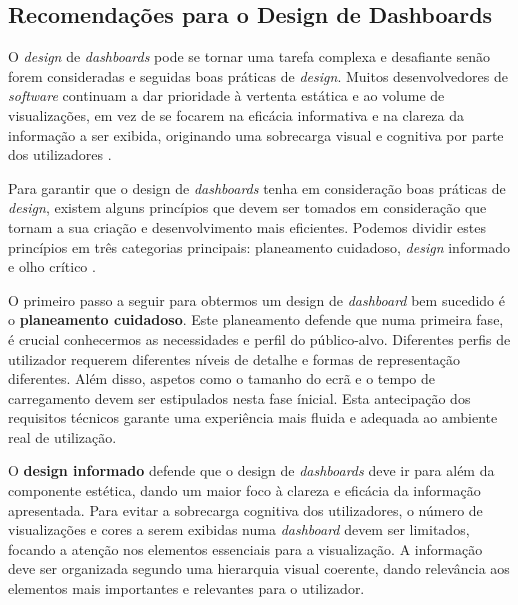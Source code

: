 \subsection{Recomendações para o Design de Dashboards} %
\label{sub:recomendacoes_design}


O \textit{design} de \textit{dashboards} pode se tornar uma tarefa complexa e desafiante senão forem consideradas e seguidas boas práticas de \textit{design}. Muitos desenvolvedores de \textit{software} continuam a dar prioridade à vertenta estática e ao volume de visualizações, em vez de se focarem na eficácia informativa e na clareza da informação a ser exibida, originando uma sobrecarga visual e cognitiva por parte dos utilizadores \cite{abduldaem2019principles}.

Para garantir que o design de \textit{dashboards} tenha em consideração boas práticas de \textit{design}, existem alguns princípios que devem ser tomados em consideração que tornam a sua criação e desenvolvimento mais eficientes. Podemos dividir estes princípios em três categorias principais: planeamento cuidadoso, \textit{design} informado e olho crítico \cite{Tableau2020}.

O primeiro passo a seguir para obtermos um design de \textit{dashboard} bem sucedido é o \textbf{planeamento cuidadoso}. Este planeamento defende que numa primeira fase, é crucial conhecermos as necessidades e perfil do público-alvo. Diferentes perfis de utilizador requerem diferentes níveis de detalhe e formas de representação diferentes. Além disso, aspetos como o tamanho do ecrã e o tempo de carregamento devem ser estipulados nesta fase ínicial. Esta antecipação dos requisitos técnicos garante uma experiência mais fluida e adequada ao ambiente real de utilização.

O \textbf{design informado} defende que o design de \textit{dashboards} deve ir para além da componente estética, dando um maior foco à clareza e eficácia da informação apresentada. Para evitar a sobrecarga cognitiva dos utilizadores, o número de visualizações e cores a serem exibidas numa \textit{dashboard} devem ser limitados, focando a atenção nos elementos essenciais para a visualização. A informação deve ser organizada segundo uma hierarquia visual coerente, dando relevância aos elementos mais importantes e relevantes para o utilizador.  

